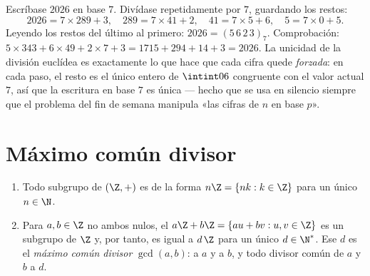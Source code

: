 \begin{example}\label{ex:b1:arith:base7}
Escríbase $2026$ en base $7$. Divídase repetidamente por $7$,
guardando los restos:
\[
2026 = 7 \times 289 + 3, \quad
289 = 7 \times 41 + 2, \quad
41 = 7 \times 5 + 6, \quad
5 = 7 \times 0 + 5 .
\]
Leyendo los restos del último al primero: $2026 = (5\,6\,2\,3)_7$.
Comprobación: $5 \times 343 + 6 \times 49 + 2 \times 7 + 3 = 1715 +
294 + 14 + 3 = 2026$. La unicidad de la división euclídea es
exactamente lo que hace que cada cifra quede \emph{forzada}: en cada
paso, el resto es el único entero de $\intint06$ congruente con el
valor actual  $7$, así que la escritura en base $7$ es única ---
hecho que se usa en silencio siempre que el problema del fin de semana
manipula «las cifras de $n$ en base $p$».
\end{example}

\section{Máximo común divisor}

\begin{theorem}\label{thm:b1:arith:gcd}
\begin{enumerate}
  \item Todo subgrupo de $(\Z, +)$ es de la forma $n\Z = \{nk : k
        \in \Z\}$ para un único $n \in \N$.
  \item Para $a, b \in \Z$ no ambos nulos, el  $a\Z + b\Z =
        \{au + bv : u, v \in \Z\}$ es un subgrupo de $\Z$ y, por
        tanto, es igual a $d\,\Z$ para un único $d \in \N^*$. Ese $d$
        es el \emph{máximo común divisor}
        $\gcd(a, b)$:  a $a$ y a $b$, y todo divisor común de
        $a$ y $b$  a $d$.
\end{enumerate}
\end{theorem}

